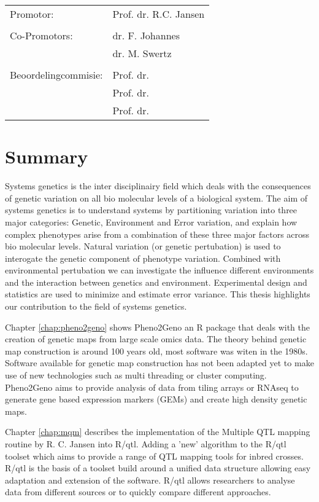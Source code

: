\documentclass[8pt, twoside]{book}
\begin{document}
\newpage
\thispagestyle{empty}
\begin{tabular}{ l l }
Promotor:             & Prof. dr. R.C. Jansen \\
                      & \\
Co-Promotors:         & dr. F. Johannes \\
                      & dr. M. Swertz \\
                      & \\
Beoordelingcommisie:  & Prof. dr. \\
                      & Prof. dr. \\
                      & Prof. dr. \\
\end{tabular}
\tableofcontents
\newpage
\chapter*{Summary}\vspace{-30pt}
Systems genetics is the inter disciplinairy field which deals with the consequences of genetic 
variation on all bio molecular levels of a biological system. The aim of systems genetics is to 
understand systems by partitioning variation into three major categories: Genetic, Environment 
and Error variation, and explain how complex phenotypes arise from a combination of these three 
major factors across bio molecular levels. Natural variation (or genetic pertubation) is used 
to interogate the genetic component of phenotype variation. Combined with environmental 
pertubation we can investigate the influence different environments and the interaction between 
genetics and environment. Experimental design and statistics are used to minimize and estimate 
error variance. This thesis highlights our contribution to the field of systems genetics.

Chapter \ref{chap:pheno2geno} shows Pheno2Geno an R package that deals with the creation of 
genetic maps from large scale omics data. The theory behind genetic map construction is around 
100 years old, most software was witen in the 1980s. Software available for genetic map construction 
has not been adapted yet to make use of new technologies such as multi threading or cluster 
computing. Pheno2Geno aims to provide analysis of data from tiling arrays or RNAseq to generate 
gene based expression markers (GEMs) and create high density genetic maps.

Chapter \ref{chap:mqm} describes the implementation of the Multiple QTL mapping routine 
by R. C. Jansen into R/qtl. Adding a 'new' algorithm to the R/qtl toolset which aims to 
provide a range of QTL mapping tools for inbred crosses. R/qtl is the basis of a toolset 
build around a unified data structure allowing easy adaptation and extension of the software. 
R/qtl allows researchers to analyse data from different sources or to quickly compare 
different approaches.
\end{document}
